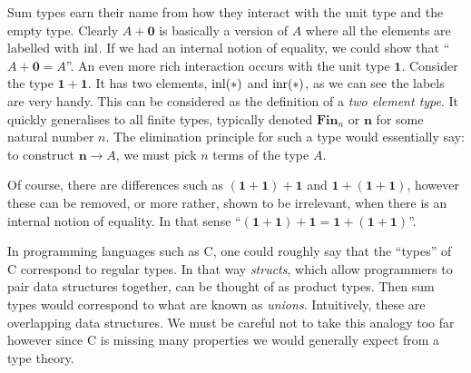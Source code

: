 \begin{defin}
    \begin{prooftree}
    \end{prooftree}

    \begin{prooftree}
    \end{prooftree}
\end{defin}

Sum types earn their name from how they interact with the unit type and the empty type. Clearly $A + \mathbf{0}$ is basically a version of $A$ where all the elements are labelled with $\inl$. If we had an internal notion of equality, we could show that ``$A + \mathbf{0} = A$''. An even more rich interaction occurs with the unit type $\mathbf{1}$. Consider the type $\mathbf{1} + \mathbf{1}$. It has two elements, $\inl(*)$ and $\inr(*)$, as we can see the labels are very handy. This can be considered as the definition of a \emph{two element type}. It quickly generalises to all finite types, typically denoted $\mathbf{Fin}_n$ or $\mathbf{n}$ for some natural number $n$.
The elimination principle for such a type would essentially say: to construct $\mathbf{n} \to A$, we must pick $n$ terms of the type $A$.

Of course, there are differences such as $(\mathbf{1} + \mathbf{1}) + \mathbf{1}$ and $\mathbf{1} + (\mathbf{1} + \mathbf{1})$, however these can be removed, or more rather, shown to be irrelevant, when there is an internal notion of equality. In that sense ``$(\mathbf{1} + \mathbf{1}) + \mathbf{1} = \mathbf{1} + (\mathbf{1} + \mathbf{1})$''.

\begin{remark}
    In programming languages such as C, one could roughly say that the ``types'' of C correspond to regular types. In that way \emph{structs}, which allow programmers to pair data structures together, can be thought of as product types. Then sum types would correspond to what are known as \emph{unions}. Intuitively, these are overlapping data structures. We must be careful not to take this analogy too far however since C is missing many properties we would generally expect from a type theory.
\end{remark}

